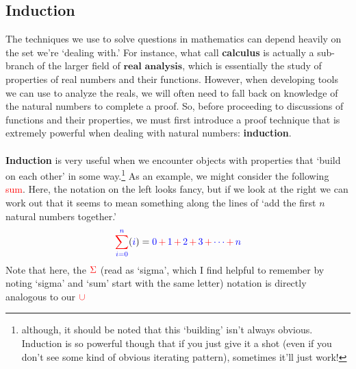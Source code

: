 \documentclass[10pt]{article}
\theoremstyle{definition}
\begin{document}
\subsection{Induction}
The techniques we use to solve questions in mathematics can depend
heavily on the set we're `dealing with.'  For instance, what call
\textbf{calculus} is actually a sub-branch of the larger field of
$\textbf{real analysis}$, which is essentially the study of properties
of real numbers and their functions.  However, when developing tools
we can use to analyze the reals, we will often need to fall back on
knowledge of the natural numbers to complete a proof.  So, before
proceeding to discussions of functions and their properties, we must
first introduce a proof technique that is extremely powerful when
dealing with natural numbers: \textbf{induction}.\\~\\
\textbf{Induction} is very useful when we encounter objects with
properties that `build on each other' in some way.\footnote{although,
  it should be noted that this `building' isn't always obvious.
  Induction is so powerful though that if you just give it a shot
  (even if you don't see some kind of obvious iterating pattern),
  sometimes it'll just work!}  As an example, we might consider the
following \textcolor{red}{sum}.  Here, the notation on the left looks
fancy, but if we look at the right we can work out that it seems to
mean something along the lines of `add the first $n$ natural numbers
together.'  %
\[{\color{red}\sum^{{\color{blue}n}}_{\color{blue} i=0}}
  ({\color{blue}i}) = \textcolor{blue}{0}
  \,{\color{red}+}\,\textcolor{blue}{1} \,{\color{red}+}\,
  \textcolor{blue}{2} \,{\color{red}+}\, \textcolor{blue}{3}
  \,{\color{red}+}\, \textcolor{blue}{\cdots} \,{\color{red}+}\,
  \textcolor{blue}{n}\]
Note that here, the $\color{red}\Sigma$ (read as `sigma', which I find
helpful to remember by noting `sigma' and `sum' start with the same
letter) notation is directly analogous to our $\color{red}\cup$
\end{document}

